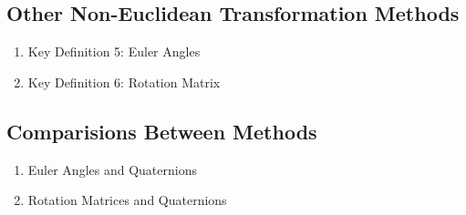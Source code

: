 \subsection{Other Non-Euclidean Transformation Methods}
	\begin{enumerate}[label={(\alph*)}]
		\item Key Definition 5: Euler Angles
		\item Key Definition 6: Rotation Matrix
	\end{enumerate}

\subsection{Comparisions Between Methods}
	\begin{enumerate}[label={(\alph*)}]
		\item Euler Angles and Quaternions
		\item Rotation Matrices and Quaternions
	\end{enumerate}
